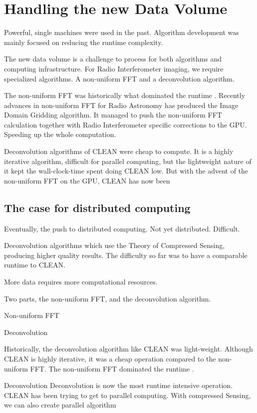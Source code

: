 \section{Handling the new Data Volume}\label{volume}

Powerful, single machines were used in the past. Algorithm development was mainly focused on reducing the runtime complexity.

The new data volume is a challenge to process for both algorithms and computing infrastructure. For Radio Interferometer imaging, we require specialized algorithms. A non-uniform FFT and a deconvolution algorithm.

The non-uniform FFT was historically what dominated the runtime \cite{}. Recently advances in non-uniform FFT for Radio Astronomy has produced the Image Domain Gridding\cite{veenboer2017image} algorithm. It managed to push the non-uniform FFT calculation together with Radio Interferometer specific corrections to the GPU. Speeding up the whole computation.

Deconvolution algorithms of CLEAN were cheap to compute. It is a highly iterative algorithm, difficult for parallel computing, but the lightweight nature of it kept the wall-clock-time spent doing CLEAN low. But with the advent of the non-uniform FFT on the GPU, CLEAN has now been

\subsection{The case for distributed computing}
Eventually, the push to distributed computing. Not yet distributed. Difficult.


Deconvolution algorithms which use the Theory of Compressed Sensing, producing higher quality results. The difficulty so far was to have a comparable runtime to CLEAN.







More data requires more computational resources.

Two parts, the non-uniform FFT, and the deconvolution algorithm.

Non-uniform FFT

Deconvolution

 Historically, the deconvolution algorithm like CLEAN was light-weight. Although CLEAN is highly iterative, it was a cheap operation compared to the non-uniform FFT. The non-uniform FFT dominated the runtime \cite{}.




Deconvolution
Deconvolution is now the most runtime intensive operation. CLEAN has been trying to get to parallel computing. With compressed Sensing, we can also create parallel algorithm





